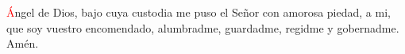 \textcolor{red}{Á}ngel de Dios, bajo cuya custodia me puso el Señor con amorosa piedad, a mi, que soy vuestro encomendado, alumbradme,
guardadme, regidme y gobernadme. Amén.